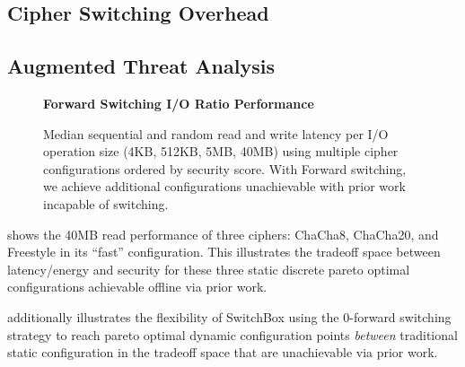 
\subsection{Cipher Switching Overhead}


\subsection{Augmented Threat Analysis}


\begin{figure}[ht]
   \textbf{Forward Switching I/O Ratio Performance}\par\medskip
   \centering
   {} \caption{Median sequential and
   random read and write latency per I/O operation size (4KB, 512KB, 5MB, 40MB)
   using multiple cipher configurations ordered by security score. With Forward
   switching, we achieve additional configurations unachievable with prior work
   incapable of switching.}
  \label{fig:tradeoff-with-ratios}
\end{figure}


 shows the 40MB read performance of three ciphers:
ChaCha8, ChaCha20, and Freestyle in its ``fast'' configuration. This illustrates
the tradeoff space between latency/energy and security for these three static
discrete pareto optimal configurations achievable offline via prior work.

 additionally illustrates the flexibility of
SwitchBox using the 0-forward switching strategy to reach pareto optimal dynamic
configuration points \emph{between} traditional static configuration in the
tradeoff space that are unachievable via prior work.

